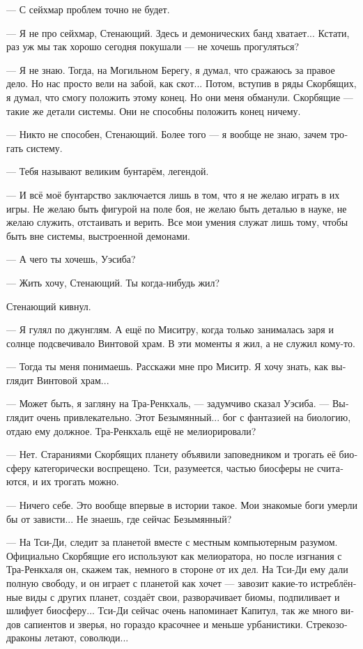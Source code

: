\documentclass[a4paper,12pt,fleqn]{book}\usepackage{cooltooltips}\usepackage{polyglossia}\setdefaultlanguage[babelshorthands=true]{russian}\setotherlanguage{english}\defaultfontfeatures{Ligatures=TeX,Mapping=tex-text} \usepackage{xcolor}\definecolor{lightgray}{HTML}{bbbbbb}\color{lightgray}\newcommand{\ml}[3]{\textenglish{\textcolor{black}{#3}}}
\newcommand{\asterism}{\vspace{1em}{\centering\Large\bfseries$\ast~\ast~\ast$\par}\vspace{1em}}
\begin{document}
--- С сейхмар проблем точно не будет.

--- Я не про сейхмар, Стенающий.
Здесь и демонических банд хватает...
Кстати, раз уж мы так хорошо сегодня покушали --- не хочешь прогуляться?

\asterism

--- Я не знаю.
Тогда, на Могильном Берегу, я думал, что сражаюсь за правое дело.
Но нас просто вели на забой, как скот...
Потом, вступив в ряды Скорбящих, я думал, что смогу положить этому конец.
Но они меня обманули.
Скорбящие --- такие же детали системы.
Они не способны положить конец ничему.

--- Никто не способен, Стенающий.
Более того --- я вообще не знаю, зачем трогать систему.

--- Тебя называют великим бунтарём, легендой.

--- И всё моё бунтарство заключается лишь в том, что я не желаю играть в их игры.
Не желаю быть фигурой на поле боя, не желаю быть деталью в науке, не желаю служить, отстаивать и верить.
Все мои умения служат лишь тому, чтобы быть вне системы, выстроенной демонами.

--- А чего ты хочешь, Уэсиба?

--- Жить хочу, Стенающий.
Ты когда-нибудь жил?

Стенающий кивнул.

--- Я гулял по джунглям.
А ещё по Миситру, когда только занималась заря и солнце подсвечивало Винтовой храм.
В эти моменты я жил, а не служил кому-то.

--- Тогда ты меня понимаешь.
Расскажи мне про Миситр.
Я хочу знать, как выглядит Винтовой храм...

\asterism

--- Может быть, я загляну на Тра-Ренкхаль, --- задумчиво сказал Уэсиба.
--- Выглядит очень привлекательно.
Этот Безымянный... бог с фантазией на биологию, отдаю ему должное.
Тра-Ренкхаль ещё не мелиорировали?

--- Нет.
Стараниями Скорбящих планету объявили заповедником и трогать её биосферу категорически воспрещено.
Тси, разумеется, частью биосферы не считаются, и их трогать можно.

--- Ничего себе.
Это вообще впервые в истории такое.
Мои знакомые боги умерли бы от зависти...
Не знаешь, где сейчас Безымянный?

--- На Тси-Ди, следит за планетой вместе с местным компьютерным разумом.
Официально Скорбящие его используют как мелиоратора, но после изгнания с Тра-Ренкхаля он, скажем так, немного в стороне от их дел.
На Тси-Ди ему дали полную свободу, и он играет с планетой как хочет --- завозит какие-то истреблённые виды с других планет, создаёт свои, разворачивает биомы, подпиливает и шлифует биосферу...
Тси-Ди сейчас очень напоминает Капитул, так же много видов сапиентов и зверья, но гораздо красочнее и меньше урбанистики.
Стрекозодраконы летают, соволюди...
\end{document}
